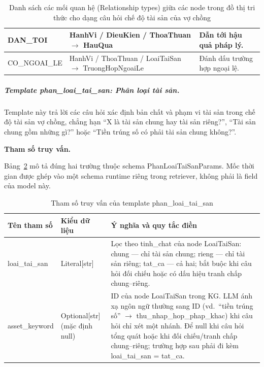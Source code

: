 \documentclass[../DoAn.tex]{subfiles}
\begin{document}
\begin{table}[htbp]
\begin{tabularx}{\textwidth}{|>{\raggedright\arraybackslash}p{2.6cm}|>{\raggedright\arraybackslash}p{2.8cm}|>{\raggedright\arraybackslash}X|}
DAN\_\allowbreak TOI &
HanhVi / DieuKien / ThoaThuan $\rightarrow$ HauQua &
Dẫn tới hậu quả pháp lý. \\ \hline

CO\_\allowbreak NGOAI\_\allowbreak LE &
HanhVi / ThoaThuan / LoaiTaiSan $\rightarrow$ \newline TruongHop\-NgoaiLe &
Đánh dấu trường hợp ngoại lệ. \\ \hline

\end{tabularx}
\caption{Danh sách các mối quan hệ (Relationship types) giữa các node trong đồ thị tri thức cho dạng câu hỏi chế độ tài sản của vợ chồng}
\label{tab:relationship_che_do_tai_san}
\end{table}

\subparagraph{Template phan\_loai\_tai\_san: Phân loại tài sản.}
Template này trả lời các câu hỏi xác định bản chất và phạm vi tài sản trong chế độ tài sản vợ chồng, chẳng hạn ``X là tài sản chung hay tài sản riêng?'', ``Tài sản chung gồm những gì?'' hoặc ``Tiền trúng số có phải tài sản chung không?''.

\textbf{Tham số truy vấn.}

Bảng~\ref{tab:phan-loai-params} mô tả đúng hai trường thuộc schema PhanLoaiTaiSanParams. Mốc thời gian được ghép vào một schema runtime riêng trong retriever, không phải là field của model này.

\begin{table}[htbp]
  \centering
\footnotesize
  \caption{Tham số truy vấn của template phan\_loai\_tai\_san}
  \label{tab:phan-loai-params}
  \begin{tabularx}{\textwidth}{|>{\raggedright\arraybackslash}p{2.6cm}|>{\raggedright\arraybackslash}p{2.4cm}|>{\raggedright\arraybackslash}X|}
    \hline
    \textbf{Tên tham số} & \textbf{Kiểu dữ liệu} & \textbf{Ý nghĩa và quy tắc điền} \\ \hline
    loai\_tai\_san &
    Literal[str] &
    Lọc theo tinh\_chat của node LoaiTaiSan:
    chung — chỉ tài sản chung;
    rieng — chỉ tài sản riêng;
    tat\_ca — cả hai; bắt buộc khi câu hỏi đối chiếu hoặc có dấu hiệu tranh chấp chung--riêng. \\ \hline
    asset\_keyword &
    Optional[str] (mặc định null) &
    ID của node LoaiTaiSan trong KG.
    LLM ánh xạ ngôn ngữ thường sang ID (vd.\ ``tiền trúng số'' $\rightarrow$ thu\_nhap\_hop\_phap\_khac) khi câu hỏi chỉ xét một nhánh.
    Để null khi câu hỏi tổng quát hoặc khi đối chiếu/tranh chấp chung--riêng; trường hợp sau phải đi kèm loai\_tai\_san = tat\_ca. \\ \hline
  \end{tabularx}
\end{table}
\end{document}
